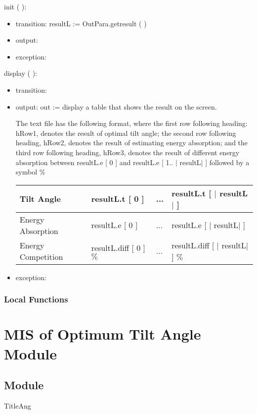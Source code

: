 \documentclass[12pt, titlepage]{article}
\begin{document}
\noindent  init ( ):
\begin{itemize}
\item transition: resultL := OutPara.getresult ( )
\item output:
\item exception: 
\end{itemize}

\noindent  display ( ):
\begin{itemize}
\item transition:
\item output: out := display a table that shows the result on the screen.

The text file has the following format, where the first row following heading: hRow1, denotes the result of optimal tilt angle; the second row following heading, hRow2, denotes the result of estimating energy absorption; and the third row following heading, hRow3, denotes the result of different energy absorption between resultL.e [ 0 ] and resultL.e [ 1.. $|$ resultL$|$ ] followed by a symbol $\%$


\begin{center}
\begin{tabular}{p{4.5cm}|p{4cm}|p{1cm}|p{5cm}}

\hline 
Tilt Angle & resultL.t [ 0 ] & ...  & resultL.t [ $|$ resultL$|$ ] \\
\hline 
Energy Absorption & resultL.e [ 0 ] & ...  & resultL.e [ $|$ resultL$|$ ] \\
\hline 
Energy Competition & resultL.diff [ 0 ] $\%$    & ...     & resultL.diff [ $|$ resultL$|$ ] $\%$    \\
\hline
\end{tabular}
\end{center}

\item exception: 
\end{itemize}


\subsubsection{Local Functions}


\section{MIS of Optimum Tilt Angle Module} \label{ModuleOT} 

\subsection{Module}
TitleAng
\end{document}
